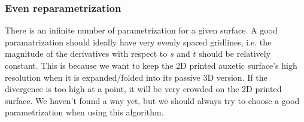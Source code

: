 \documentclass{article}
\begin{document}
\subsubsection{Even reparametrization}
There is an infinite number of parametrization for a given surface. A good paramatrization should ideally have very evenly spaced gridlines, i.e. the magnitude of the derivatives with respect to $s$ and $t$ should be relatively constant. This is because we want to keep the 2D printed auxetic surface's high resolution when it is expanded/folded into its passive 3D version. If the divergence is too high at a point, it will be very crowded on the 2D printed surface. We haven't found a way yet, but we should always try to choose a good parametrization when using this algorithm.
\end{document}
